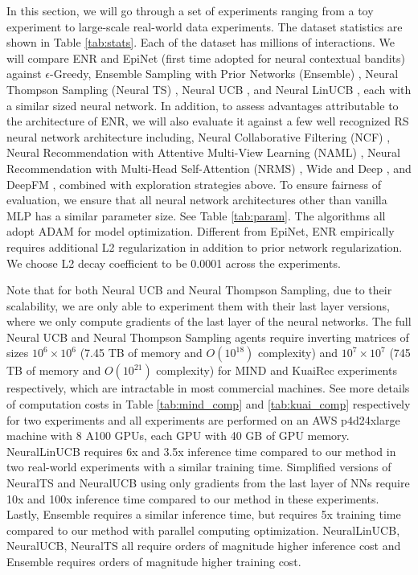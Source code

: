 In this section, we will go through a set of experiments ranging from a toy experiment to large-scale real-world data experiments. The dataset statistics are shown in Table \ref{tab:stats}. Each of the dataset has millions of interactions. We will compare ENR and EpiNet \cite{osband2021epistemic} (first time adopted for neural contextual bandits) against $\epsilon$-Greedy, Ensemble Sampling with Prior Networks (Ensemble) \cite{lu2017ensemble}, Neural Thompson Sampling (Neural TS) \cite{zhang2021neural}, Neural UCB \cite{zhou2020neural}, and Neural LinUCB \cite{xu2021neural}, each with a similar sized neural network. In addition, to assess advantages attributable to the architecture of ENR, we will also evaluate it against a few well recognized RS neural network architecture including, Neural Collaborative Filtering (NCF) \cite{he2017neural}, Neural Recommendation with Attentive Multi-View Learning (NAML) \cite{wu2019naml}, Neural Recommendation with Multi-Head Self-Attention (NRMS) \cite{wu2019neural}, Wide and Deep \cite{cheng2016wide}, and DeepFM \cite{guo2017deepfm}, combined with exploration strategies above. To ensure fairness of evaluation, we ensure that all neural network architectures other than vanilla MLP has a similar parameter size. See Table \ref{tab:param}. The algorithms all adopt ADAM \cite{kingma2015adam} for model optimization. Different from EpiNet, ENR empirically requires additional L2 regularization in addition to prior network regularization. We choose L2 decay coefficient to be 0.0001 across the experiments. 

Note that for both Neural UCB and Neural Thompson Sampling, due to their scalability, we are only able to experiment them with their last layer versions, where we only compute gradients of the last layer of the neural networks. The full Neural UCB and Neural Thompson Sampling agents require inverting matrices of sizes $10^6 \times 10^6$ (7.45 TB of memory and $O(10^{18})$ complexity) and $10^7 \times 10^7$ (745 TB of memory and $O(10^{21})$ complexity) for MIND and KuaiRec experiments respectively, which are intractable in most commercial machines. See more details of computation costs in Table \ref{tab:mind_comp} and \ref{tab:kuai_comp} respectively for two experiments and all experiments are performed on an AWS p4d24xlarge machine with 8 A100 GPUs, each GPU with 40 GB of GPU memory. NeuralLinUCB requires 6x and 3.5x inference time compared to our method in two real-world experiments with a similar training time.  Simplified versions of NeuralTS and NeuralUCB using only gradients from the last layer of NNs require 10x and 100x inference time compared to our method in these experiments. Lastly, Ensemble requires a similar inference time, but requires 5x training time compared to our method with parallel computing optimization. NeuralLinUCB, NeuralUCB, NeuralTS all require orders of magnitude higher inference cost and Ensemble requires orders of magnitude higher training cost.

